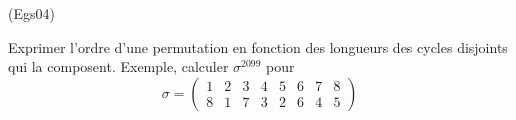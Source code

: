 \begin{tiny}(Egs04)\end{tiny}
Exprimer l'ordre d'une permutation en fonction des longueurs des cycles disjoints qui la composent. Exemple, calculer $\sigma^{2099}$ pour
\begin{displaymath}
 \sigma =
\begin{pmatrix}
 1 & 2 & 3 & 4 & 5 & 6 & 7 & 8 \\ 8 & 1 & 7 & 3 & 2 & 6 & 4 & 5
\end{pmatrix}
\end{displaymath}
